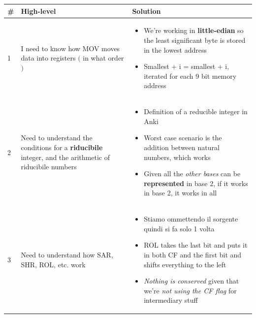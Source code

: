 \documentclass[a4paper,12pt]{article}
\begin{document}
\noindent\hspace*{-1.5cm}
    \begin{tabular}{|C{0.7cm}|C{8cm}|C{8cm}|}
        \hline
        \textbf{\#} & \textbf{High-level} & \textbf{Solution} \\
        
        \hline
        
        1 
        &
        I need to know how MOV moves data into registers $($ in what order $)$
        & 
        \begin{itemize}[label=$\rightarrow$]
            \item We're working in \textbf{little-edian} so the least significant byte is stored in the lowest address
            \item Smallest + i = smallest + i, iterated for each 9 bit memory address
        \end{itemize}   
        \\
        
        \hline


        2
        &
        Need to understand the conditions for a \textbf{riducibile} integer, and the arithmetic of riducibile numbers
        &
         \begin{itemize}[label=\(\rightarrow\)]
            \item Definition of a reducible integer in Anki 
            \item Worst case scenario is the addition between natural numbers, which works
            \item Given all the \textit{other bases} can be \textbf{represented} in base 2, if it works in base 2, it works in all 
        \end{itemize}   
        \\

        \hline

        3
        &
        Need to understand how SAR, SHR, ROL, etc. work
        &
         \begin{itemize}[label=\(\rightarrow\)]
            \item Stiamo ommettendo il sorgente quindi si fa solo 1 volta
            \item ROL takes the last bit and puts it in both CF and the first bit and shifts everything to the left
            \item \textit{Nothing is conserved} given that we're \textit{not using the CF flag} for intermediary stuff
        \end{itemize}
        

\end{tabular}
\end{document}
